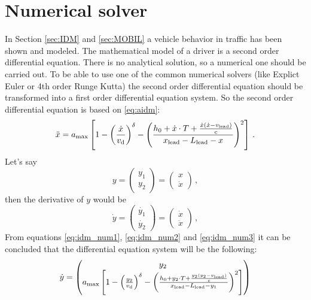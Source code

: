 		\section{Numerical solver}
			In Section \ref{sec:IDM} and \ref{sec:MOBIL} a vehicle behavior in traffic has been shown and modeled. The mathematical model of a driver is a second order differential equation. There is no analytical solution, so a numerical one should be carried out. To be able to use one of the common numerical solvers (like Explict Euler or 4th order Runge Kutta) the second order differential equation should be transformed into a first order differential equation system. So the second order differential equation is based on \ref{eq:aidm}:
			\begin{equation}
				\ddot{x}=a_{\rm max}\left [ 1 - \left ( \frac{\dot{x}}{{v_{\rm d}}} \right )^\delta - \left ( \frac{h_0 + \dot{x}\cdot T + \frac{\dot{x}(\dot{x}-v_{\rm lead})}{{\rm c}}}{x_{\rm lead}-L_{\rm lead} - x} \right )^2 \right ]\,.
				\label{eq:idm_num1}
			\end{equation}
			Let's say
			\begin{equation}
				y=
				\begin{pmatrix}
					y_1\\
					y_2
				\end{pmatrix}
				=
				\begin{pmatrix}
					x\\
					\dot{x}
				\end{pmatrix}\,,
				\label{eq:idm_num2}
			\end{equation}
			then the derivative of $y$ would be
			\begin{equation}
				\dot{y}=
				\begin{pmatrix}
					\dot{y_1}\\
					\dot{y_2}
				\end{pmatrix}
				=
				\begin{pmatrix}
					\dot{x}\\
					\ddot{x}
				\end{pmatrix}\,,
				\label{eq:idm_num3}
			\end{equation}
			From equations \ref{eq:idm_num1}, \ref{eq:idm_num2} and \ref{eq:idm_num3} it can be concluded that the differential equation system will be the following:
			\begin{equation}
				\dot{y}=
				\begin{pmatrix}
					y_2\\
					a_{\rm max}\left [ 1 - \left ( \frac{y_2}{{v_{\rm d}}} \right )^{\delta} - \left ( \frac{h_0 + y_2\cdot T + \frac{y_2(y_2-v_{\rm lead})}{{\rm c}}}{x_{\rm lead} - L_{\rm lead} - y_1} \right )^2 \right ]
				\end{pmatrix}
				\label{eq:numerical_idm}
			\end{equation}